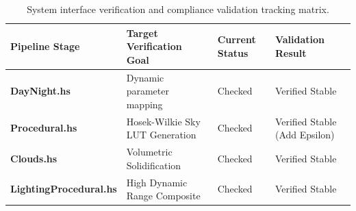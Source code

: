 \documentclass[11pt,a4paper]{article}
\begin{document}
\begin{table}[h!]
\centering
\small
\begin{tabular}{llll}
\toprule
\textbf{Pipeline Stage} & \textbf{Target Verification Goal} & \textbf{Current Status} & \textbf{Validation Result} \\ \midrule
\textbf{DayNight.hs} & Dynamic parameter mapping & Checked & Verified Stable \\
\textbf{Procedural.hs} & Hosek-Wilkie Sky LUT Generation & Checked & Verified Stable (Add Epsilon) \\
\textbf{Clouds.hs} & Volumetric Solidification & Checked & Verified Stable \\
\textbf{LightingProcedural.hs} & High Dynamic Range Composite & Checked & Verified Stable \\ \bottomrule
\end{tabular}
\caption{System interface verification and compliance validation tracking matrix.}
\end{table}
\end{document}
